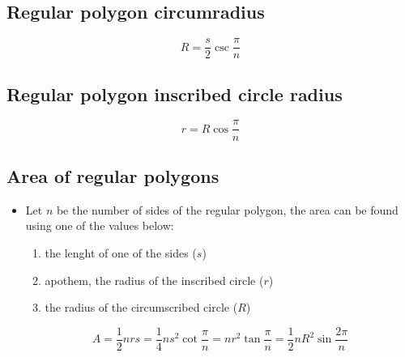 \subsection{Regular polygon circumradius}

    \def\R{3}

    \begin{figure}[H]
    \end{figure}

    \[
        R = \frac{s}{2}\csc\frac{\pi}{n}
    \]

\subsection{Regular polygon inscribed circle radius}

    \def\R{3}

    \begin{figure}[H]
    \end{figure}

        \[
        r = R\cos \frac{\pi}{n}
        \]



\subsection{Area of regular polygons}

    \begin{itemize}
        \item Let $n$ be the number of sides of the regular polygon, the area can be found using one of the values below:
            \begin{enumerate}
                \item  the lenght of one of the sides ($s$)
                \item apothem, the radius of the inscribed circle ($r$)
                \item the radius of the circumscribed circle ($R$)
            \end{enumerate}

        \[
            A = \frac{1}{2}nrs = \frac{1}{4}ns^2\cot \frac{\pi}{n} = nr^2\tan \frac{\pi}{n} = \frac{1}{2}nR^2\sin \frac{2\pi}{n}
        \]

    \end{itemize}



